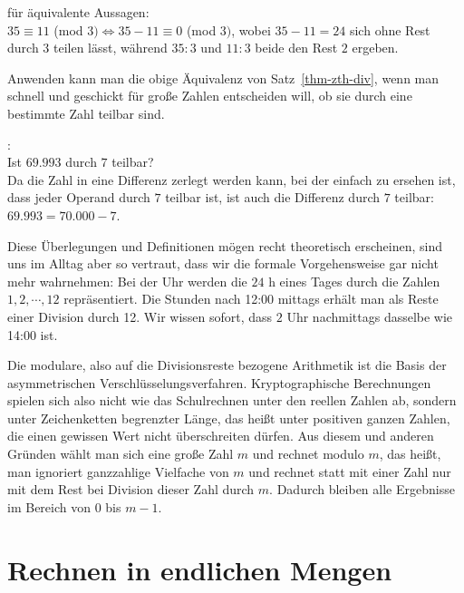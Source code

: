\begin{refsegment}
\begin{example}{ für äquivalente Aussagen:}\\
$35 \equiv 11$ (mod $3) \Longleftrightarrow  35 - 11 \equiv 0$ (mod $3)$,
wobei $35 - 11 = 24$ sich ohne Rest durch $3$ teilen lässt, während $35:3$ und
$11:3$ beide den Rest $2$ ergeben.
\end{example}


Anwenden kann man die obige Äquivalenz von Satz~\ref{thm-zth-div}, wenn man schnell
und geschickt für große Zahlen entscheiden will, ob sie durch eine bestimmte
Zahl teilbar sind.

\begin{example}{:}\\
Ist $69.993$ durch $7$ teilbar?\\
Da die Zahl in eine Differenz zerlegt werden kann, bei der einfach zu ersehen
ist, dass jeder Operand durch $7$ teilbar ist, ist auch die Differenz durch $7$
teilbar: $69.993 = 70.000 - 7$.\\
\end{example}

Diese Überlegungen und Definitionen mögen recht theoretisch erscheinen, sind
uns im Alltag aber so vertraut, dass wir die formale Vorgehensweise gar nicht
mehr wahrnehmen: Bei der Uhr werden die $24$ h eines Tages durch die Zahlen
$1, 2, \cdots, 12$ repräsentiert. Die Stunden nach 12:00 mittags erhält man als
Reste einer Division durch 12. Wir wissen sofort, dass $2$ Uhr nachmittags
dasselbe wie 14:00 ist.

Die \glqq modulare\grqq, also auf die Divisionsreste bezogene Arithmetik ist die
Basis der asymmetrischen Verschlüsselungsverfahren.
Kryptographische Berechnungen spielen sich also nicht wie das Schulrechnen
unter den reellen Zahlen ab, sondern unter Zeichenketten begrenzter Länge,
das heißt unter positiven ganzen Zahlen, die einen gewissen Wert nicht
überschreiten dürfen.
Aus diesem und anderen Gründen wählt man sich eine große Zahl $m$ und \glqq rechnet
modulo $m$\grqq, das heißt, man ignoriert ganzzahlige Vielfache von $m$ und rechnet
statt mit einer Zahl nur mit dem Rest bei Division dieser Zahl durch $m$.
Dadurch bleiben alle Ergebnisse im Bereich von $0$ bis $m-1$.


\section{Rechnen in endlichen Mengen}


\end{refsegment}
